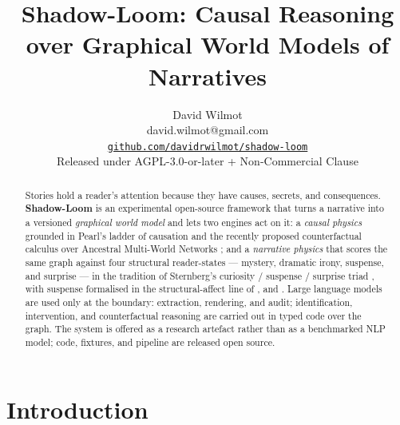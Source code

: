 \documentclass[11pt]{article}
\title{Shadow-Loom: Causal Reasoning over Graphical World Models of Narratives}
\author{David Wilmot \\
        david.wilmot@gmail.com \\
        \texttt{\href{https://github.com/dwlmt/shadow-loom}{github.com/davidrwilmot/shadow-loom}} \\
        Released under AGPL-3.0-or-later + Non-Commercial Clause}
\begin{document}
\maketitle

\begin{abstract}
Stories hold a reader's attention because they have causes,
secrets, and consequences. \textbf{Shadow-Loom} is an experimental
open-source framework that turns a narrative into a versioned
\emph{graphical world model} and lets two engines act
on it: a \emph{causal physics} grounded in Pearl's ladder of
causation \citep{pearl2009causality,bareinboim2022pearl} and the
recently proposed counterfactual calculus over Ancestral
Multi-World Networks \citep{correa2025amwn}; and a
\emph{narrative physics} that scores the same graph against four
structural reader-states --- mystery, dramatic irony, suspense,
and surprise --- in the tradition of Sternberg's curiosity /
suspense / surprise triad \citep{sternberg1992telling}, with
suspense formalised in the structural-affect line of
\citet{brewer1982stories}, \citet{comisky1982suspense} and
\citet{cheong2015suspenser}. Large language models are used
only at the boundary: extraction, rendering, and audit;
identification, intervention, and counterfactual reasoning are
carried out in typed code over the graph. The system is offered
as a research artefact rather than as a benchmarked NLP model;
code, fixtures, and pipeline are released open source.
\end{abstract}


\section{Introduction}
\label{sec:intro}
\end{document}
